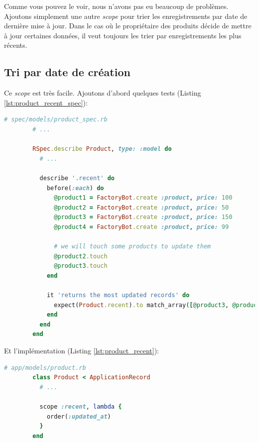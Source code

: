 \documentclass[]{report}
\begin{document}
      Comme vous pouvez le voir, nous n'avons pas eu beaucoup de problèmes. Ajoutons simplement une autre \textit{scope} pour trier les enregistrements par date de dernière mise à jour. Dans le cas où le propriétaire des produits décide de mettre à jour certaines données, il veut toujours les trier par enregistrements les plus récents.

    \subsection{Tri par date de création}

      Ce \textit{scope} est très facile. Ajoutons d'abord quelques tests (Listing \ref{lst:product_recent_spec}):

      \begin{scriptsize}
        \begin{lstlisting}[language=ruby, caption={Test du filtrage des produits par date de création}, label={lst:product_recent_spec}]
        # spec/models/product_spec.rb
        # ...

        RSpec.describe Product, type: :model do
          # ...

          describe '.recent' do
            before(:each) do
              @product1 = FactoryBot.create :product, price: 100
              @product2 = FactoryBot.create :product, price: 50
              @product3 = FactoryBot.create :product, price: 150
              @product4 = FactoryBot.create :product, price: 99

              # we will touch some products to update them
              @product2.touch
              @product3.touch
            end

            it 'returns the most updated records' do
              expect(Product.recent).to match_array([@product3, @product2, @product4, @product1])
            end
          end
        end
        \end{lstlisting}
      \end{scriptsize}

      Et l'implémentation (Listing \ref{lst:product_recent}):

      \begin{scriptsize}
        \begin{lstlisting}[language=ruby, caption={Implémentation du filtrage des produits par date de création}, label={lst:product_recent}]
        # app/models/product.rb
        class Product < ApplicationRecord
          # ...

          scope :recent, lambda {
            order(:updated_at)
          }
        end
        \end{lstlisting}
      \end{scriptsize}
\end{document}
